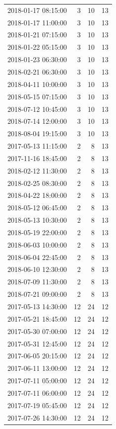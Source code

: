 \begin{tabular}{lrrr}
2018-01-17 08:15:00 & 3 & 10 & 13 \\
2018-01-17 11:00:00 & 3 & 10 & 13 \\
2018-01-21 07:15:00 & 3 & 10 & 13 \\
2018-01-22 05:15:00 & 3 & 10 & 13 \\
2018-01-23 06:30:00 & 3 & 10 & 13 \\
2018-02-21 06:30:00 & 3 & 10 & 13 \\
2018-04-11 10:00:00 & 3 & 10 & 13 \\
2018-05-15 07:15:00 & 3 & 10 & 13 \\
2018-07-12 10:45:00 & 3 & 10 & 13 \\
2018-07-14 12:00:00 & 3 & 10 & 13 \\
2018-08-04 19:15:00 & 3 & 10 & 13 \\
2017-05-13 11:15:00 & 2 & 8 & 13 \\
2017-11-16 18:45:00 & 2 & 8 & 13 \\
2018-02-12 11:30:00 & 2 & 8 & 13 \\
2018-02-25 08:30:00 & 2 & 8 & 13 \\
2018-04-22 18:00:00 & 2 & 8 & 13 \\
2018-05-12 06:45:00 & 2 & 8 & 13 \\
2018-05-13 10:30:00 & 2 & 8 & 13 \\
2018-05-19 22:00:00 & 2 & 8 & 13 \\
2018-06-03 10:00:00 & 2 & 8 & 13 \\
2018-06-04 22:45:00 & 2 & 8 & 13 \\
2018-06-10 12:30:00 & 2 & 8 & 13 \\
2018-07-09 11:30:00 & 2 & 8 & 13 \\
2018-07-21 09:00:00 & 2 & 8 & 13 \\
2017-05-13 14:30:00 & 12 & 24 & 12 \\
2017-05-21 18:45:00 & 12 & 24 & 12 \\
2017-05-30 07:00:00 & 12 & 24 & 12 \\
2017-05-31 12:45:00 & 12 & 24 & 12 \\
2017-06-05 20:15:00 & 12 & 24 & 12 \\
2017-06-11 13:00:00 & 12 & 24 & 12 \\
2017-07-11 05:00:00 & 12 & 24 & 12 \\
2017-07-11 06:00:00 & 12 & 24 & 12 \\
2017-07-19 05:45:00 & 12 & 24 & 12 \\
2017-07-26 14:30:00 & 12 & 24 & 12 \\

\end{tabular}
